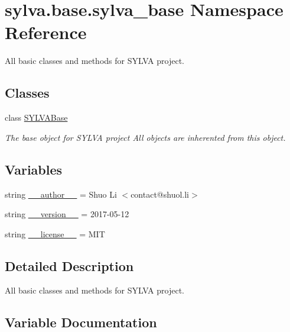 \hypertarget{namespacesylva_1_1base_1_1sylva__base}{}\section{sylva.\+base.\+sylva\+\_\+base Namespace Reference}
\label{namespacesylva_1_1base_1_1sylva__base}


All basic classes and methods for S\+Y\+L\+VA project.  


\subsection*{Classes}
\begin{DoxyCompactItemize}
\item 
class \hyperlink{classsylva_1_1base_1_1sylva__base_1_1_s_y_l_v_a_base}{S\+Y\+L\+V\+A\+Base}
\begin{DoxyCompactList}\small\item\em The base object for S\+Y\+L\+VA project All objects are inherented from this object. \end{DoxyCompactList}\end{DoxyCompactItemize}
\subsection*{Variables}
\begin{DoxyCompactItemize}
\item 
string \hyperlink{namespacesylva_1_1base_1_1sylva__base_a9fea8ee3b352af33fbc91fc6b30bc96d}{\+\_\+\+\_\+author\+\_\+\+\_\+} = \textquotesingle{}Shuo Li $<$contact@shuol.\+li$>$\textquotesingle{}
\item 
string \hyperlink{namespacesylva_1_1base_1_1sylva__base_a1c9ea5e48ee3c68a0be5f377d7ccbc7b}{\+\_\+\+\_\+version\+\_\+\+\_\+} = \textquotesingle{}2017-\/05-\/12\textquotesingle{}
\item 
string \hyperlink{namespacesylva_1_1base_1_1sylva__base_aae4c25229ad03df0705787971e295dd3}{\+\_\+\+\_\+license\+\_\+\+\_\+} = \textquotesingle{}M\+IT\textquotesingle{}
\end{DoxyCompactItemize}


\subsection{Detailed Description}
All basic classes and methods for S\+Y\+L\+VA project. 

\subsection{Variable Documentation}
\mbox{\label{namespacesylva_1_1base_1_1sylva__base_a9fea8ee3b352af33fbc91fc6b30bc96d}} 
